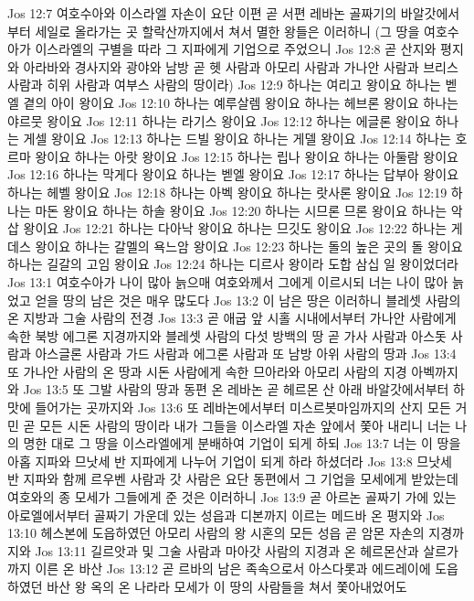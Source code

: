 Jos 12:7  여호수아와 이스라엘 자손이 요단 이편 곧 서편 레바논 골짜기의 바알갓에서부터 세일로 올라가는 곳 할락산까지에서 쳐서 멸한 왕들은 이러하니 (그 땅을 여호수아가 이스라엘의 구별을 따라 그 지파에게 기업으로 주었으니
Jos 12:8  곧 산지와 평지와 아라바와 경사지와 광야와 남방 곧 헷 사람과 아모리 사람과 가나안 사람과 브리스 사람과 히위 사람과 여부스 사람의 땅이라)
Jos 12:9  하나는 여리고 왕이요 하나는 벧엘 곁의 아이 왕이요
Jos 12:10  하나는 예루살렘 왕이요 하나는 헤브론 왕이요 하나는 야르뭇 왕이요
Jos 12:11  하나는 라기스 왕이요
Jos 12:12  하나는 에글론 왕이요 하나는 게셀 왕이요
Jos 12:13  하나는 드빌 왕이요 하나는 게델 왕이요
Jos 12:14  하나는 호르마 왕이요 하나는 아랏 왕이요
Jos 12:15  하나는 립나 왕이요 하나는 아둘람 왕이요
Jos 12:16  하나는 막게다 왕이요 하나는 벧엘 왕이요
Jos 12:17  하나는 답부아 왕이요 하나는 헤벨 왕이요
Jos 12:18  하나는 아벡 왕이요 하나는 랏사론 왕이요
Jos 12:19  하나는 마돈 왕이요 하나는 하솔 왕이요
Jos 12:20  하나는 시므론 므론 왕이요 하나는 악삽 왕이요
Jos 12:21  하나는 다아낙 왕이요 하나는 므깃도 왕이요
Jos 12:22  하나는 게데스 왕이요 하나는 갈멜의 욕느암 왕이요
Jos 12:23  하나는 돌의 높은 곳의 돌 왕이요 하나는 길갈의 고임 왕이요
Jos 12:24  하나는 디르사 왕이라 도합 삼십 일 왕이었더라
Jos 13:1  여호수아가 나이 많아 늙으매 여호와께서 그에게 이르시되 너는 나이 많아 늙었고 얻을 땅의 남은 것은 매우 많도다
Jos 13:2  이 남은 땅은 이러하니 블레셋 사람의 온 지방과 그술 사람의 전경
Jos 13:3  곧 애굽 앞 시홀 시내에서부터 가나안 사람에게 속한 북방 에그론 지경까지와 블레셋 사람의 다섯 방백의 땅 곧 가사 사람과 아스돗 사람과 아스글론 사람과 가드 사람과 에그론 사람과 또 남방 아위 사람의 땅과
Jos 13:4  또 가나안 사람의 온 땅과 시돈 사람에게 속한 므아라와 아모리 사람의 지경 아벡까지와
Jos 13:5  또 그발 사람의 땅과 동편 온 레바논 곧 헤르몬 산 아래 바알갓에서부터 하맛에 들어가는 곳까지와
Jos 13:6  또 레바논에서부터 미스르봇마임까지의 산지 모든 거민 곧 모든 시돈 사람의 땅이라 내가 그들을 이스라엘 자손 앞에서 쫓아 내리니 너는 나의 명한 대로 그 땅을 이스라엘에게 분배하여 기업이 되게 하되
Jos 13:7  너는 이 땅을 아홉 지파와 므낫세 반 지파에게 나누어 기업이 되게 하라 하셨더라
Jos 13:8  므낫세 반 지파와 함께 르우벤 사람과 갓 사람은 요단 동편에서 그 기업을 모세에게 받았는데 여호와의 종 모세가 그들에게 준 것은 이러하니
Jos 13:9  곧 아르논 골짜기 가에 있는 아로엘에서부터 골짜기 가운데 있는 성읍과 디본까지 이르는 메드바 온 평지와
Jos 13:10  헤스본에 도읍하였던 아모리 사람의 왕 시혼의 모든 성읍 곧 암몬 자손의 지경까지와
Jos 13:11  길르앗과 및 그술 사람과 마아갓 사람의 지경과 온 헤르몬산과 살르가까지 이른 온 바산
Jos 13:12  곧 르바의 남은 족속으로서 아스다롯과 에드레이에 도읍하였던 바산 왕 옥의 온 나라라 모세가 이 땅의 사람들을 쳐서 쫓아내었어도
